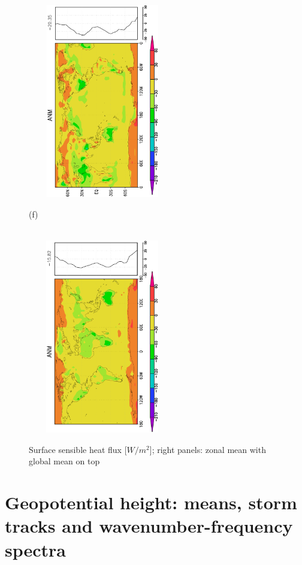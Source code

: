 \documentclass[12pt,a4paper,twoside,openright,headinclude,liststotoc,bibtotoc]{scrreprt}
\begin{document}
\begin{figure}[H]
{\includegraphics[height=8.5cm,width=6.5cm,angle=-90]
{eps/zonaltmsshflu146.eps}
}
\parbox{8.5cm}{\hspace{0.48cm}\begin{scriptsize}(f)\end{scriptsize} \vspace{-0.7cm} \\
\includegraphics[height=8.5cm,width=6.5cm,angle=-90]
{eps/zonalt21tmsshfl146final.eps}
}
\caption[Surface sensible heat flux]{Surface sensible heat flux [$W/m^{2}$]; right panels: zonal mean with global mean on top}
\label{img:sshfl}
\end{figure}


\vspace{-0.4cm}
\chapter{Geopotential height: means, storm tracks and wavenumber-frequency spectra}
\vspace{-0.4cm}
\end{document}
